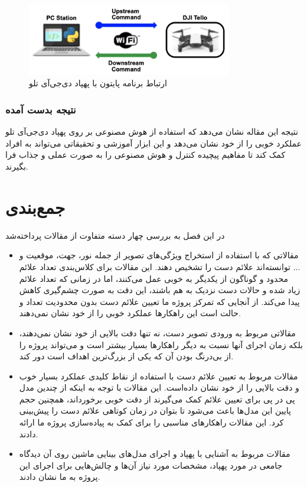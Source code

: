 \begin{figure}[h]
    \centering
    \includegraphics[width=0.8\textwidth]{tello.png}
    \caption[ارتباط برنامه پایتون با پهپاد دی‌جی‌آی تلو ]{ارتباط برنامه پایتون با پهپاد دی‌جی‌آی تلو \cite{ghazi2023use}}
\end{figure}

\subsubsection{نتیجه بدست آمده}
نتیجه این مقاله نشان می‌دهد که استفاده از هوش مصنوعی بر روی پهپاد دی‌جی‌آی تلو عملکرد خوبی را از خود نشان می‌دهد و این ابزار آموزشی و تحقیقاتی می‌تواند به افراد کمک کند تا مفاهیم پیچیده کنترل و هوش مصنوعی را به صورت عملی و جذاب فرا بگیرند. 


\section{جمع‌بندی}

در این فصل به بررسی چهار دسته متفاوت از مقالات پرداخته‌شد 
\begin{itemize}
    \item مقالاتی که با استفاده از استخراج ویژگی‌های تصویر از جمله نور، جهت، موقعیت و ... توانسته‌اند علائم دست را تشخیص دهند. این مقالات برای کلاس‌بندی تعداد علائم محدود و گوناگون از یکدیگر به خوبی عمل می‌کنند، اما در زمانی که تعداد علائم زیاد شده و حالات دست نزدیک به هم باشند، این دقت به صورت چشم‌گیری کاهش پیدا می‌کند. از آنجایی که تمرکز پروژه ما تعیین علائم دست بدون محدودیت تعداد و حالت است این راهکار‌ها عملکرد خوبی را از خود نشان نمی‌دهند.
    \item مقالاتی مربوط به ورودی تصویر دست، نه تنها دقت بالایی از خود نشان نمی‌دهند، بلکه زمان اجرای آنها نسبت به دیگر راهکارها بسیار بیشتر است و می‌تواند پروژه را از بی‌درنگ بودن آن که یکی از بزرگ‌ترین اهداف است دور کند.
    \item مقالات مربوط به تعیین علائم دست با استفاده از نقاط کلیدی عملکرد بسیار خوب و دقت بالایی را از خود نشان داده‌است. این مقالات با توجه به اینکه از چندین مدل پی در پی برای تعیین علائم کمک می‌گیرند از دقت خوبی برخورداند، همچنین حجم پایین این مدل‌ها باعث می‌شود تا بتوان در زمان کوتاهی علائم دست را پیش‌بینی کرد. این مقالات راهکار‌های مناسبی را برای کمک به پیاده‌سازی پروژه ما ارائه دادند.
    \item مقالات مربوط به آشنایی با پهپاد و اجرای مدل‌های بینایی ماشین روی آن دیدگاه جامعی در مورد پهپاد، مشخصات مورد نیاز آن‌ها و چالش‌هایی برای اجرای این پروژه به ما نشان دادند.
\end{itemize}

